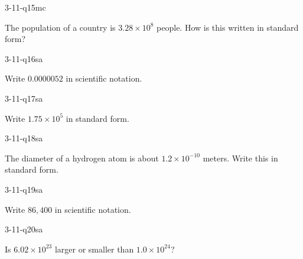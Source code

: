 \begin{practiceQuestion}{3-11-q15}{mc}
\begin{questionText}
The population of a country is $3.28 \times 10^8$ people. How is this written in standard form?
\end{questionText}
\end{practiceQuestion}


\begin{practiceQuestion}{3-11-q16}{sa}
\begin{questionText}
Write $0.0000052$ in scientific notation.
\end{questionText}
\end{practiceQuestion}

\begin{practiceQuestion}{3-11-q17}{sa}
\begin{questionText}
Write $1.75 \times 10^5$ in standard form.
\end{questionText}
\end{practiceQuestion}

\begin{practiceQuestion}{3-11-q18}{sa}
\begin{questionText}
The diameter of a hydrogen atom is about $1.2 \times 10^{-10}$ meters. Write this in standard form.
\end{questionText}
\end{practiceQuestion}

\begin{practiceQuestion}{3-11-q19}{sa}
\begin{questionText}
Write $86{,}400$ in scientific notation.
\end{questionText}
\end{practiceQuestion}

\begin{practiceQuestion}{3-11-q20}{sa}
\begin{questionText}
Is $6.02 \times 10^{23}$ larger or smaller than $1.0 \times 10^{24}$?
\end{questionText}
\end{practiceQuestion}

